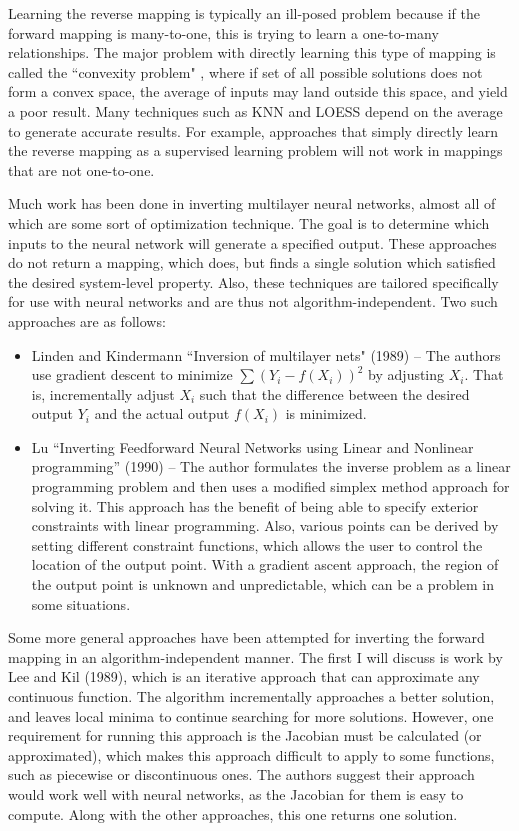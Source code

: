 Learning the reverse mapping is typically an ill-posed problem because if the forward mapping is many-to-one, this is trying to learn a one-to-many relationships.
The major problem with directly learning this type of mapping is called the ``convexity problem" \cite{jordan-forward}, where if set of all possible solutions does not form a convex space, the average of inputs may land outside this space, and yield a poor result.
Many techniques such as KNN and LOESS depend on the average to generate accurate results.
For example,  approaches that simply directly learn the reverse mapping as a supervised learning problem \cite{widrow1985adaptive} will not work in mappings that are not one-to-one.

Much work has been done in inverting multilayer neural networks, almost all of which are some sort of optimization technique.
The goal is to determine which inputs to the neural network will generate a specified output.
These approaches do not return a mapping, which \fw does, but finds a single solution which satisfied the desired system-level property.
Also, these techniques are tailored specifically for use with neural networks and are thus not algorithm-independent.
Two such approaches are as follows:
\begin{itemize}
\item Linden and Kindermann ``Inversion of multilayer nets" (1989)\nocite{linden1989inversion} --
The authors use gradient descent to minimize $\sum (Y_i - f(X_i))^2$ by adjusting $X_i$.
That is, incrementally adjust $X_i$ such that the difference between the desired output $Y_i$ and the actual output $f(X_i)$ is minimized.
\item Lu ``Inverting Feedforward Neural Networks using Linear and Nonlinear programming'' (1990)\nocite{lu1999inverting} -- 
The author formulates the inverse problem as a linear programming problem and then uses a modified simplex method approach for solving it.
This approach has the benefit of being able to specify exterior constraints with linear programming.
Also, various points can be derived by setting different constraint functions, which allows the user to control the location of the output point.
With a gradient ascent approach, the region of the output point is unknown and unpredictable, which can be a problem in some situations.
\end{itemize}

Some more general approaches have been attempted for inverting the forward mapping in an algorithm-independent manner.
The first I will discuss is work by Lee and Kil (1989)\nocite{lee1994inverse}, which is an iterative approach that can approximate any continuous function.
The algorithm incrementally approaches a better solution, and leaves local minima to continue searching for more solutions.
However, one requirement for running this approach is the Jacobian must be calculated (or approximated), which makes this approach difficult to apply to some functions, such as piecewise or discontinuous ones.
The authors suggest their approach would work well with neural networks, as the Jacobian for them is easy to compute.
Along with the other approaches, this one returns one solution.

